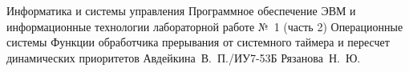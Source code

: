 \makereporttitle
{Информатика и системы управления} %
{Программное обеспечение ЭВМ и информационные технологии} %
{лабораторной работе №~1 (часть 2)} %
{Операционные системы} %
{Функции обработчика прерывания от системного таймера и пересчет динамических приоритетов} %
{} %
{Авдейкина~В.~П./ИУ7-53Б} %
{Рязанова~Н.~Ю.} %